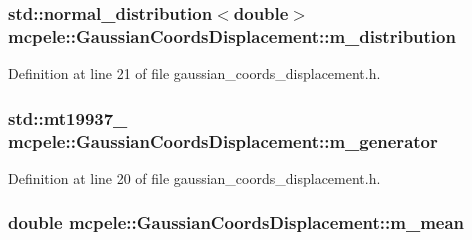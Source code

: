 \hypertarget{classmcpele_1_1GaussianCoordsDisplacement_a231f5ed3fcf7b644e7bdd44cbd6d318d}{
\subsubsection[{m\-\_\-distribution}]{\setlength{\rightskip}{0pt plus 5cm}std\-::normal\-\_\-distribution$<$double$>$ {\bf mcpele\-::\-Gaussian\-Coords\-Displacement\-::m\-\_\-distribution}}}\label{classmcpele_1_1GaussianCoordsDisplacement_a231f5ed3fcf7b644e7bdd44cbd6d318d}


\-Definition at line 21 of file gaussian\-\_\-coords\-\_\-displacement.\-h.

\hypertarget{classmcpele_1_1GaussianCoordsDisplacement_a1e9c3d0a0135be68c503e4148a55f0b6}{
\subsubsection[{m\-\_\-generator}]{\setlength{\rightskip}{0pt plus 5cm}std\-::mt19937\-\_ {\bf mcpele\-::\-Gaussian\-Coords\-Displacement\-::m\-\_\-generator}}}\label{classmcpele_1_1GaussianCoordsDisplacement_a1e9c3d0a0135be68c503e4148a55f0b6}


\-Definition at line 20 of file gaussian\-\_\-coords\-\_\-displacement.\-h.

\hypertarget{classmcpele_1_1GaussianCoordsDisplacement_a515b27b041db3301e85bd4da6ba44383}{
\subsubsection[{m\-\_\-mean}]{\setlength{\rightskip}{0pt plus 5cm}double {\bf mcpele\-::\-Gaussian\-Coords\-Displacement\-::m\-\_\-mean}}}\label{classmcpele_1_1GaussianCoordsDisplacement_a515b27b041db3301e85bd4da6ba44383}


